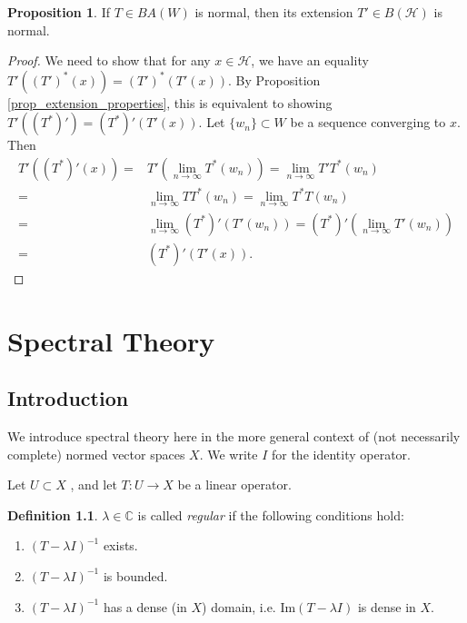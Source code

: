 \documentclass{dcthesis}
\numberwithin{equation}{section}
\numberwithin{equation}{section}
\theoremstyle{definition}
\newtheorem{proposition}[equation]{Proposition}
\newtheorem{definition}[equation]{Definition}
\begin{document}
\begin{proposition}
	If $T\in BA(W)$ is normal, then its extension $T'\in B(\mathcal{H})$ is normal.
\end{proposition}
\begin{proof}
	We need to show that for any $x\in\mathcal{H}$, we have an equality $T'((T')^\ast(x))=(T')^\ast(T'(x))$. By Proposition \ref{prop_extension_properties}, this is equivalent to showing $T'((T^\ast)') = (T^\ast)'(T'(x))$. Let $\{w_n\}\subset W$ be a sequence converging to $x$. Then 
	\begin{align*}
		T'((T^\ast)'(x)) =& T'(\lim_{n\to\infty}T^\ast(w_n)) = \lim_{n\to\infty}T'T^\ast(w_n) \\
		=& \lim_{n\to\infty}TT^\ast(w_n) = \lim_{n\to\infty}T^\ast T(w_n) \\
		=& \lim_{n\to\infty} (T^\ast)'( T'(w_n) ) = (T^\ast)'(\lim_{n\to\infty}T'(w_n)) \\
		=& (T^\ast)'(T'(x)).
	\end{align*}
\end{proof}


\chapter{Spectral Theory}


\section{Introduction} %

We introduce spectral theory here in the more general context of (not necessarily complete) normed vector spaces $X$. We write $I$ for the identity operator.

Let $U\subset X$ , and let $T:U \to X$ be a linear operator.

\begin{definition} %
\label{def_regular}
	$\lambda\in\mathbb{C}$ is called \emph{regular} if the following conditions hold:
	\begin{enumerate}[label=R\arabic*.,ref=R\arabic*]
		\item\label{def_regular_exists} $(T-\lambda I)^{-1}$ exists.
		\item\label{def_regular_bounded} $(T-\lambda I)^{-1}$ is bounded.
		\item\label{def_regular_dense} $(T-\lambda I)^{-1}$ has a dense (in $X$) domain, i.e. $\text{Im}(T-\lambda I)$ is dense in $X$.
	\end{enumerate}
\end{definition}
\end{document}
